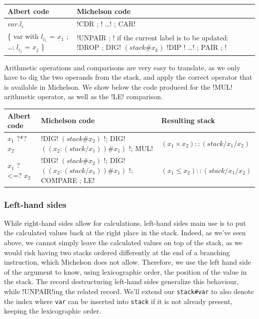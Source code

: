 \documentclass{report}
\begin{document}
{\small
\begin{longtable}{l|p{10cm}}
  Albert code & Michelson code \\
  \hline
  $var.l_i$ & !CDR ; ! \ldots ! ; CAR! \\
  \hline
  \{ var with $l_{i_1}$ = $x_1$ ; \ldots ; $l_{i_j}$ = $x_j$ \} & !UNPAIR ; ! \newline
  if the current label is to be updated: !DROP ; DIG! $(stack\#x_k)$ \newline
  !DIP {! \ldots !} ; PAIR ; !
\end{longtable}
}

Arithmetic operations and comparisons are very easy to translate, as we only have to dig the two operands from the stack, and apply the correct operator that is available in Michelson. We show below the code produced for the !MUL! arithmetic operator, as well as the !LE! comparison.

{\small
\begin{longtable}{l|p{9.5cm}|l}
  Albert code & Michelson code & Resulting stack\\
  \hline
  $x_1$ ?*? $x_2$ & !DIG! $(stack\#x_2)$ !; DIG! $((x_2:(stack/x_1))\#x_1)$ !; MUL! & $(x_1 \times x_2)::(stack/x_1/x_2)$\\
  \hline
  $x_1$ ?<=? $x_2$ & !DIG! $(stack\#x_2)$ !; DIG! $((x_2:(stack/x_1))\#x_1)$ !; COMPARE ; LE! & $(x_1 \le x_2)::(stack/x_1/x_2)$\\
\end{longtable}
}

\subsubsection{Left-hand sides}

While right-hand sides allow for calculations, left-hand sides main use is to put the calculated values back at the right place in the stack. Indeed, as we've seen above, we cannot simply leave the calculated values on top of the stack, as we would risk having two stacks ordered differently at the end of a branching instruction, which Michelson does not allow. Therefore, we use the left hand side of the argument to know, using lexicographic order, the position of the value in the stack. The record destructuring left-hand sides generalize this behaviour, while !UNPAIR!ing the related record. We'll extend our \texttt{stack\#var} to also denote the index where \texttt{var} can be inserted into \texttt{stack} if it is not already present, keeping the lexicographic order.
\end{document}
